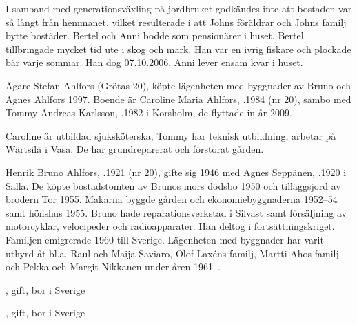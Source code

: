 I samband med generationsväxling på jordbruket godkändes inte att bostaden var så långt från hemmanet, vilket resulterade i att Johns föräldrar och Johns familj bytte bostäder. Bertel och Anni bodde som pensionärer i huset. Bertel tillbringade mycket tid ute i skog och mark. Han var en ivrig fiskare och plockade bär varje sommar. Han dog 07.10.2006. Anni lever ensam kvar i huset.



%



%
Ägare Stefan Ahlfors (Grötas 20), köpte lägenheten med byggnader av Bruno och Agnes Ahlfors 1997. Boende är Caroline  Maria Ahlfors, .1984 (nr 20), sambo med Tommy Andreas Karlsson, .1982 i Korsholm, de flyttade in år 2009.

Caroline är utbildad sjuksköterska, Tommy har teknisk utbildning, arbetar på Wärtsilä i Vasa. De har grundreparerat och förstorat gården.
\begin{jhchildren}
  \item {}
  \item {}
\end{jhchildren}


%
Henrik Bruno Ahlfors, .1921 (nr 20), gifte sig 1946 med Agnes Seppänen, .1920 i Salla. De köpte bostadstomten av Brunos mors dödsbo 1950 och tilläggsjord av brodern Tor 1955. Makarna byggde gården och ekonomiebyggnaderna 1952--54 samt hönshus 1955. Bruno hade reparationsverkstad i Silvast samt försäljning av motorcyklar, velocipeder och radioapparater. Han deltog i fortsättningskriget. Familjen emigrerade 1960 till Sverige.  Lägenheten med byggnader har varit uthyrd  åt bl.a. Raul och Maija Saviaro, Olof Laxéns familj, Martti Ahos familj och Pekka och Margit Nikkanen under åren 1961--.
\begin{jhchildren}
  \item {}, gift, bor i Sverige
  \item {}, gift, bor i Sverige
\end{jhchildren}

